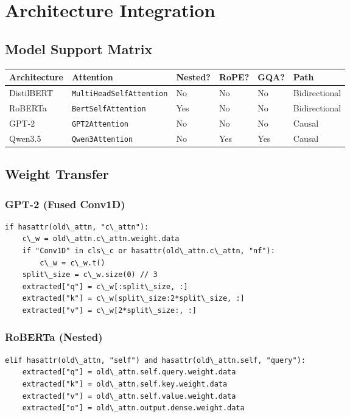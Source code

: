 
\section{Architecture Integration}

\subsection{Model Support Matrix}

\begin{table}[H]
\centering
\small
\begin{tabular}{llllll}
\toprule
\textbf{Architecture} & \textbf{Attention} & \textbf{Nested?} & \textbf{RoPE?} & \textbf{GQA?} & \textbf{Path} \\
\midrule
DistilBERT & \texttt{MultiHeadSelfAttention} & No & No & No & Bidirectional \\
RoBERTa & \texttt{BertSelfAttention} & Yes & No & No & Bidirectional \\
GPT-2 & \texttt{GPT2Attention} & No & No & No & Causal \\
Qwen3.5 & \texttt{Qwen3Attention} & No & Yes & Yes & Causal \\
\bottomrule
\end{tabular}
\end{table}

\subsection{Weight Transfer}

\subsubsection{GPT-2 (Fused Conv1D)}

\begin{lstlisting}
if hasattr(old\_attn, "c\_attn"):
    c\_w = old\_attn.c\_attn.weight.data
    if "Conv1D" in cls\_c or hasattr(old\_attn.c\_attn, "nf"):
        c\_w = c\_w.t()
    split\_size = c\_w.size(0) // 3
    extracted["q"] = c\_w[:split\_size, :]
    extracted["k"] = c\_w[split\_size:2*split\_size, :]
    extracted["v"] = c\_w[2*split\_size:, :]
\end{lstlisting}

\subsubsection{RoBERTa (Nested)}

\begin{lstlisting}
elif hasattr(old\_attn, "self") and hasattr(old\_attn.self, "query"):
    extracted["q"] = old\_attn.self.query.weight.data
    extracted["k"] = old\_attn.self.key.weight.data
    extracted["v"] = old\_attn.self.value.weight.data
    extracted["o"] = old\_attn.output.dense.weight.data
\end{lstlisting}

